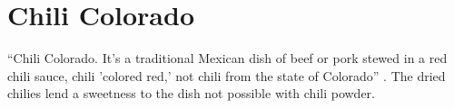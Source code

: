 \section{Chili Colorado}\label{chili_colorado_goat}

\begin{recipestats}[
        servings=4 people,
        preptime=30 \minute,
        bakingtime=2 \hour,
        source=\citeauthor{rMartinez2015}~\cite{rMartinez2015},
    ]
\end{recipestats}

\begin{recipeabstract}
    ``Chili Colorado. It's a traditional Mexican dish of beef or pork stewed in a red chili sauce, chili
    'colored red,' not chili from the state of Colorado'' \cite{rMartinez2015}.
    The dried chilies lend a sweetness to the dish not possible with chili powder.
\end{recipeabstract}

\begin{ingredientcolumns}
    \begin{ingredientblock}
        \\
        \\
        \\
        \\
    \end{ingredientblock}
    \begin{ingredientblock}
        \\
        \\
        \\
        \\
    \end{ingredientblock}
\end{ingredientcolumns}

